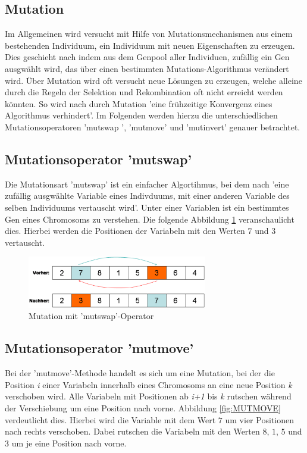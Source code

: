 \subsection{Mutation}
\label{subsec:Mutation}
Im Allgemeinen wird versucht mit Hilfe von Mutationsmechanismen aus einem
bestehenden Individuum, ein Individuum mit neuen Eigenschaften zu erzeugen.
Dies geschieht nach \cite{ErbenSkript} indem aus dem Genpool aller Individuen,
zufällig ein Gen ausgwählt wird, das über einen bestimmten Mutations-Algorithmus
verändert wird. Über Mutation wird oft versucht neue Lösungen zu erzeugen, welche
alleine durch die Regeln der Selektion und Rekombination oft nicht erreicht werden
könnten. So wird nach \cite{url:UniPaderborn} durch Mutation 'eine
frühzeitige Konvergenz eines Algorithmus verhindert'. Im Folgenden werden hierzu
die unterschiedlichen Mutationsoperatoren 'mutswap ', 'mutmove' und  'mutinvert'
genauer betrachtet.

\subsection{Mutationsoperator 'mutswap'}
\label{subsec:mutswap}
Die Mutationsart 'mutswap' ist ein einfacher Algortihmus, bei dem nach 
\cite{url:geatbx-documentation} 'eine zufällig ausgwählte Variable eines
Indivduums, mit einer anderen Variable des selben Individuums vertauscht
wird'. Unter einer Variablen ist ein bestimmtes Gen eines Chromosoms zu
verstehen. Die folgende Abbildung \ref{fig:MUTSWAP} veranschaulicht dies.
Hierbei werden die Positionen der Variabeln mit den Werten $7$ und $3$
vertauscht.

\begin{figure} 
  \centering
  \includegraphics[width=0.7\textwidth]{../images/picMUTSWAP}
  \caption{Mutation mit 'mutswap'-Operator}
  \label{fig:MUTSWAP}
\end{figure}

\subsection{Mutationsoperator 'mutmove'}
\label{subsec:mutmove}
Bei der 'mutmove'-Methode handelt es sich um eine Mutation, bei der 
die Position \textit{i} einer Variabeln  innerhalb eines Chromosoms
an eine neue Position \textit{k} verschoben wird. Alle Variabeln
mit Positionen ab \textit{i+1} bis \textit{k} rutschen während
der Verschiebung um eine Position nach vorne.  
Abbildung \ref{fig:MUTMOVE} verdeutlicht dies. Hierbei wird
die Variable mit dem Wert $7$ um vier Positionen nach rechts verschoben.
Dabei rutschen die Variabeln mit den Werten $8$, $1$, $5$ und $3$ um je
eine Position nach vorne.

